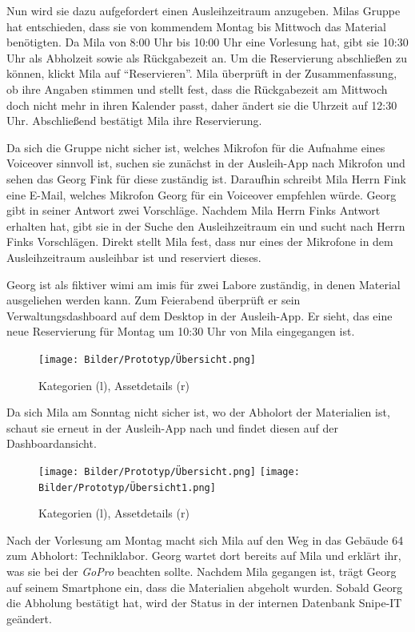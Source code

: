 Nun wird sie dazu aufgefordert einen Ausleihzeitraum anzugeben. Milas Gruppe hat entschieden, dass
sie von kommendem Montag bis Mittwoch das Material benötigten. Da Mila von 8:00 Uhr bis 10:00 Uhr
eine Vorlesung hat, gibt sie 10:30 Uhr als Abholzeit sowie als Rückgabezeit an. Um die Reservierung
abschließen zu können, klickt Mila auf \enquote{Reservieren}. Mila überprüft in der Zusammenfassung,
ob ihre Angaben stimmen und stellt fest, dass die Rückgabezeit am Mittwoch doch nicht mehr in ihren
Kalender passt, daher ändert sie die Uhrzeit auf 12:30 Uhr. Abschließend bestätigt Mila ihre
Reservierung.

Da sich die Gruppe nicht sicher ist, welches Mikrofon für die Aufnahme eines Voiceover sinnvoll ist,
suchen sie zunächst in der Ausleih-App nach Mikrofon und sehen das Georg Fink für diese zuständig ist.
Daraufhin schreibt Mila Herrn Fink eine E-Mail, welches Mikrofon Georg für ein Voiceover empfehlen würde.
Georg gibt in seiner Antwort zwei Vorschläge. Nachdem Mila Herrn Finks Antwort erhalten hat, gibt sie in
der Suche den Ausleihzeitraum ein und sucht nach Herrn Finks Vorschlägen. Direkt stellt Mila fest, dass nur
eines der Mikrofone in dem Ausleihzeitraum ausleihbar ist und reserviert dieses.

Georg ist als fiktiver \ac{wimi} am \ac{imis} für zwei Labore zuständig, in denen Material
ausgeliehen werden kann. Zum Feierabend überprüft er sein Verwaltungsdashboard auf dem Desktop in
der Ausleih-App. Er sieht, das eine neue Reservierung für Montag um 10:30 Uhr von Mila eingegangen
ist.

\begin{figure}[h]
    \centering
    \texttt{[image: Bilder/Prototyp/Übersicht.png]}
    \label{fig:p4}
    \caption[Mockup: Kategorien, Assets, Assetdetails]{Kategorien (l), Assetdetails (r)}
\end{figure}

Da sich Mila am Sonntag nicht sicher ist, wo der Abholort der Materialien ist, schaut sie
erneut in der Ausleih-App nach und findet diesen auf der Dashboardansicht.

\begin{figure}[h]
    \centering
    \texttt{[image: Bilder/Prototyp/Übersicht.png]}\hspace{2em}
    \texttt{[image: Bilder/Prototyp/Übersicht1.png]}
    \label{fig:p4}
    \caption[Mockup: Kategorien, Assets, Assetdetails]{Kategorien (l), Assetdetails (r)}
\end{figure}

Nach der Vorlesung am Montag macht sich Mila auf den Weg in das Gebäude 64 zum Abholort: Techniklabor.
Georg wartet dort bereits auf Mila und erklärt ihr, was sie bei der \textit{GoPro} beachten sollte.
Nachdem Mila gegangen ist, trägt Georg auf seinem Smartphone ein, dass die Materialien abgeholt wurden.
Sobald Georg die Abholung bestätigt hat, wird der Status in der internen Datenbank Snipe-IT
geändert.

